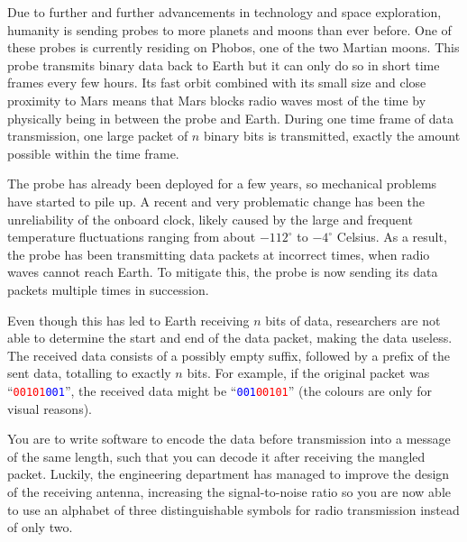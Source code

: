 \newcommand{\maxn}{10^5}

\problemname{}

%
Due to further and further advancements in technology and space exploration, humanity is sending probes to more planets and moons than ever before.
One of these probes is currently residing on Phobos, one of the two Martian moons.
This probe transmits binary data back to Earth but it can only do so in short time frames every few hours.
Its fast orbit combined with its small size and close proximity to Mars means that Mars blocks radio waves most of the time by physically being in between the probe and Earth.
During one time frame of data transmission, one large packet of $n$ binary bits is transmitted, exactly the amount possible within the time frame.

The probe has already been deployed for a few years, so mechanical problems have started to pile up.
A recent and very problematic change has been the unreliability of the onboard clock, likely caused by the large and frequent temperature fluctuations ranging from about $-112^\circ$ to $-4^\circ$ Celsius.
As a result, the probe has been transmitting data packets at incorrect times, when radio waves cannot reach Earth.
To mitigate this, the probe is now sending its data packets multiple times in succession.

Even though this has led to Earth receiving $n$ bits of data, researchers are not able to determine the start and end of the data packet, making the data useless.
The received data consists of a possibly empty suffix, followed by a prefix of the sent data, totalling to exactly $n$ bits.
For example, if the original packet was ``\textcolor{red}{\texttt{00101}}\textcolor{blue}{\texttt{001}}'', the received data might be ``\textcolor{blue}{\texttt{001}}\textcolor{red}{\texttt{00101}}'' (the colours are only for visual reasons).

You are to write software to encode the data before transmission into a message of the same length, such that you can decode it after receiving the mangled packet.
Luckily, the engineering department has managed to improve the design of the receiving antenna, increasing the signal-to-noise ratio so you are now able to use an alphabet of three distinguishable symbols for radio transmission instead of only two.

